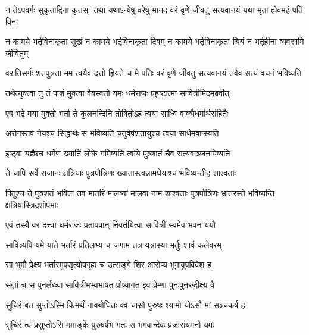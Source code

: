 \begin{center}



\fourlineindentedshloka
{न तेऽपवर्गः सुकृताद्विना कृतस्-}
{तथा यथाऽन्येषु वरेषु मानद}
{वरं वृणे जीवतु सत्यवानयं}
{यथा मृता ह्येवमहं पतिं विना}


\fourlineindentedshloka
{न कामये भर्तृविनाकृता सुखं}
{न कामये भर्तृविनाकृता दिवम्}
{न कामये भर्तृविनाकृता श्रियं}
{न भर्तृहीना व्यवसामि जीवितुम्}


\fourlineindentedshloka
{वरातिसर्गः शतपुत्रता मम}
{त्वयैव दत्तो ह्रियते च मे पतिः}
{वरं वृणे जीवतु सत्यवानयं}
{तवैव सत्यं वचनं भविष्यति}




\twolineshloka
{तथेत्युक्त्वा तु तं पाशं मुक्त्वा वैवस्वतो यमः}
{धर्मराजः प्रहृष्टात्मा सावित्रीमिदमब्रवीत्}


\twolineshloka
{एष भद्रे मया मुक्तो भर्ता ते कुलनन्दिनि}
{तोषितोऽहं त्वया साध्वि वाक्यैर्धर्मार्थसंहितैः}


\twolineshloka
{अरोगस्तव नेयश्च सिद्धार्थः स भविष्यति}
{चतुर्वर्षशतायुश्च त्वया सार्धमवाप्स्यति}


\twolineshloka
{इष्ट्वा यज्ञैश्च धर्मेण ख्यातिं लोके गमिष्यति}
{त्वयि पुत्रशतं चैव सत्यवाञ्जनयिष्यति}


\twolineshloka
{ते चापि सर्वे राजानः क्षत्रियाः पुत्रपौत्रिणः}
{ख्यातास्त्वन्नामधेयाश्च भविष्यन्तीह शाश्वताः}


\threelineshloka
{पितुश्च ते पुत्रशतं भविता तव मातरि}
{मालव्यां मालवा नाम शाश्वताः पुत्रपौत्रिणः}
{भ्रातरस्ते भविष्यन्ति क्षत्रियास्त्रिदशोपमाः}


\twolineshloka
{एवं तस्यै वरं दत्त्वा धर्मराजः प्रतापवान्}
{निवर्तयित्वा सावित्रीं स्वमेव भवनं ययौ}


\twolineshloka
{सावित्र्यपि यमे याते भर्तारं प्रतिलभ्य च}
{जगाम तत्र यत्रास्या भर्तुः शावं कलेवरम्}


\twolineshloka
{सा भूमौ प्रेक्ष्य भर्तारमुपसृत्योपगृह्य च}
{उत्सङ्गे शिर आरोप्य भूमावुपविवेश ह}


\twolineshloka
{संज्ञां च स पुनर्लब्ध्वा सावित्रीमभ्यभाषत}
{प्रोष्यागत इव प्रेम्णा पुनःपुनरुदीक्ष्य वै}


\twolineshloka
{सुचिरं बत सुप्तोऽस्मि किमर्थं नावबोधितः}
{क्व चासौ पुरुषः श्यामो योऽसौ मां सञ्चकर्ष ह}




\twolineshloka
{सुचिरं त्वं प्रसुप्तोऽसि ममाङ्के पुरुषर्षभ}
{गतः स भगवान्देवः प्रजासंयमनो यमः}



\end{center}
